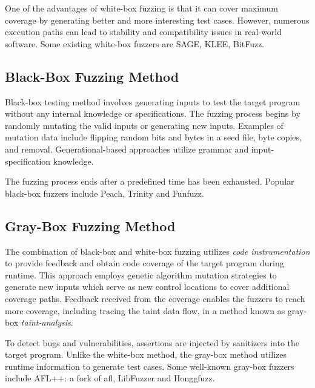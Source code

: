 One of the advantages of white-box fuzzing is that it can cover maximum coverage by generating
better and more interesting test cases. However, numerous execution paths can lead to stability and
compatibility issues in real-world software\cite{lomeli2022security}\cite{liang2018fuzzing}.
Some existing white-box fuzzers are SAGE\cite{godefroid2012sage}, KLEE\cite{cadar2008klee},
BitFuzz\cite{caballero2010input}.\newline

\subsection{Black-Box Fuzzing Method}
Black-box testing method involves generating inputs to test the target program without any
internal knowledge or specifications. The fuzzing process begins by randomly mutating
the valid inputs or generating new inputs. Examples of mutation data include flipping random bits
and bytes in a seed file, byte copies, and removal\cite{jaaskela2016genetic}.
Generational-based approaches utilize grammar and input-specification knowledge\cite{kim2013automatic}.

The fuzzing process ends after a predefined time has been exhausted. Popular black-box fuzzers
include Peach\cite{PeachFuz35:online}, Trinity\cite{GitHubke76:online} and
Funfuzz\cite{GitHubMo73:online}.\newline

\subsection{Gray-Box Fuzzing Method}
The combination of black-box and white-box fuzzing utilizes \textit{code instrumentation}
to provide feedback and obtain code coverage of the target program during runtime\cite{bohme2021fuzzing}.
This approach employs genetic algorithm mutation strategies to generate new inputs which serve as
new control locations to cover additional coverage paths. Feedback received from the coverage
enables the fuzzers to reach more coverage, including tracing the taint data flow, in a method known
as gray-box \textit{taint-analysis}\cite{bekrar2012taint}.

To detect bugs and vulnerabilities, assertions are injected by sanitizers into the target program.
Unlike the white-box method, the gray-box method utilizes runtime information to generate test cases.
Some well-known gray-box fuzzers include AFL++\cite{257204}: a fork
of \gls{afl}\cite{GitHubgo92:online}, LibFuzzer\cite{libFuzze17:online} and Honggfuzz\cite{GitHubgo89:online}.\newline


